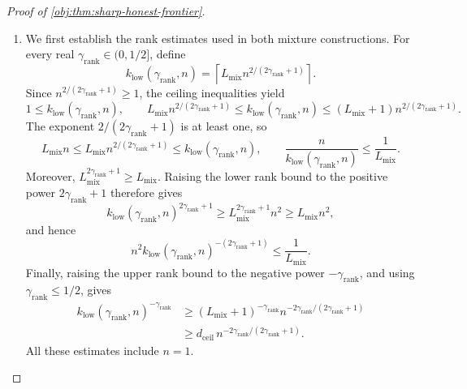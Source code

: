 \documentclass[11pt]{article}
\begin{document}
\begin{proof}[Proof of \cref{obj:thm:sharp-honest-frontier}]
\begin{enumerate}
\item We first establish the rank estimates used in both mixture constructions.
For every real \(\gamma_{\mathrm{rank}}\in(0,1/2]\), define
\[
k_{\mathrm{low}}(\gamma_{\mathrm{rank}},n)
=
\left\lceil
L_{\mathrm{mix}}n^{2/(2\gamma_{\mathrm{rank}}+1)}
\right\rceil.
\]
Since \(n^{2/(2\gamma_{\mathrm{rank}}+1)}\ge1\), the ceiling inequalities yield
\[
1\le k_{\mathrm{low}}(\gamma_{\mathrm{rank}},n),\qquad
L_{\mathrm{mix}}n^{2/(2\gamma_{\mathrm{rank}}+1)}
\le k_{\mathrm{low}}(\gamma_{\mathrm{rank}},n)
\le
(L_{\mathrm{mix}}+1)n^{2/(2\gamma_{\mathrm{rank}}+1)}.
\]
The exponent \(2/(2\gamma_{\mathrm{rank}}+1)\) is at least one, so
\[
L_{\mathrm{mix}}n
\le
L_{\mathrm{mix}}n^{2/(2\gamma_{\mathrm{rank}}+1)}
\le k_{\mathrm{low}}(\gamma_{\mathrm{rank}},n),
\qquad
\frac{n}{k_{\mathrm{low}}(\gamma_{\mathrm{rank}},n)}
\le\frac1{L_{\mathrm{mix}}}.
\]
Moreover, \(L_{\mathrm{mix}}^{2\gamma_{\mathrm{rank}}+1}\ge L_{\mathrm{mix}}\).
Raising the lower rank bound to the positive power \(2\gamma_{\mathrm{rank}}+1\) therefore gives
\[
k_{\mathrm{low}}(\gamma_{\mathrm{rank}},n)^{2\gamma_{\mathrm{rank}}+1}
\ge
L_{\mathrm{mix}}^{2\gamma_{\mathrm{rank}}+1}n^2
\ge L_{\mathrm{mix}}n^2,
\]
and hence
\[
n^2k_{\mathrm{low}}(\gamma_{\mathrm{rank}},n)^{-(2\gamma_{\mathrm{rank}}+1)}
\le\frac1{L_{\mathrm{mix}}}.
\]
Finally, raising the upper rank bound to the negative power
\(-\gamma_{\mathrm{rank}}\), and using
\(\gamma_{\mathrm{rank}}\le1/2\), gives
\[
\begin{aligned}
k_{\mathrm{low}}(\gamma_{\mathrm{rank}},n)^{-\gamma_{\mathrm{rank}}}
&\ge
(L_{\mathrm{mix}}+1)^{-\gamma_{\mathrm{rank}}}
n^{-2\gamma_{\mathrm{rank}}/(2\gamma_{\mathrm{rank}}+1)}\\
&\ge
d_{\mathrm{ceil}}\,
n^{-2\gamma_{\mathrm{rank}}/(2\gamma_{\mathrm{rank}}+1)}.
\end{aligned}
\]
All these estimates include \(n=1\).


\end{enumerate}
\end{proof}
\end{document}
